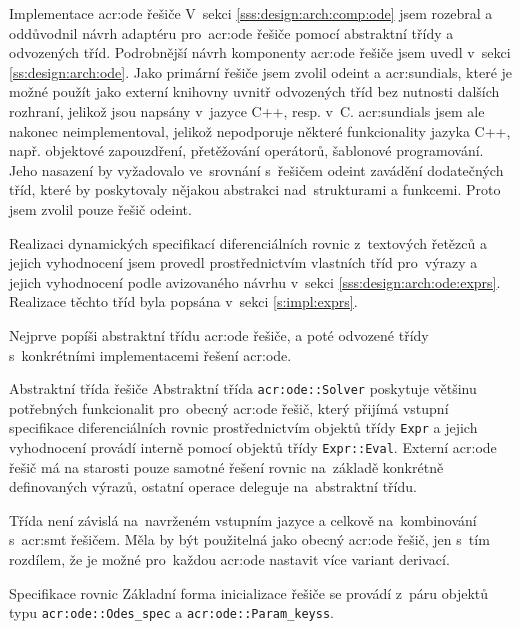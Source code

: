 \documentclass[thesis=M,czech]{FITthesis}[2012/06/26]
\newcommand{\acrlabel}[1]{acr:#1}
\newcommand{\acr}[1]{\acrshort{\acrlabel{#1}}}
\newcommand{\id}[1]{\texttt{#1}}
\newcommand{\rf}[1]{\ref{#1}}
\begin{document}
\begin{section}{Implementace \acr{ode} řešiče}\label{s:impl:ode}
V~sekci \rf{sss:design:arch:comp:ode} jsem rozebral
a oddůvodnil návrh adaptéru pro~\acr{ode} řešiče
pomocí abstraktní třídy a odvozených tříd.
Podrobnější návrh komponenty \acr{ode} řešiče
jsem uvedl v~sekci \rf{ss:design:arch:ode}.
Jako primární řešiče jsem zvolil odeint a \acr{sundials},
které je možné použít jako externí knihovny
uvnitř odvozených tříd bez nutnosti dalších rozhraní,
jelikož jsou napsány v~jazyce C++, resp. v~C.
\acr{sundials} jsem ale nakonec neimplementoval,
jelikož nepodporuje některé funkcionality jazyka C++,
např. objektové zapouzdření,
přetěžování operátorů, šablonové programování.
Jeho nasazení by vyžadovalo ve~srovnání s~řešičem odeint
zavádění dodatečných tříd,
které by poskytovaly nějakou abstrakci nad~strukturami a funkcemi.
Proto jsem zvolil pouze řešič odeint.

Realizaci dynamických specifikací diferenciálních rovnic
z~textových řetězců a jejich vyhodnocení
jsem provedl prostřednictvím
vlastních tříd pro~výrazy a jejich vyhodnocení
podle avizovaného návrhu v~sekci \rf{sss:design:arch:ode:exprs}.
Realizace těchto tříd byla popsána v~sekci \rf{s:impl:exprs}.

Nejprve popíši abstraktní třídu \acr{ode} řešiče,
a poté odvozené třídy s~konkrétními implementacemi řešení \acr{ode}.


\begin{subsection}{Abstraktní třída řešiče}
\label{ss:impl:ode:solver}
Abstraktní třída \id{\acr{ode}::\-Solver}
poskytuje většinu potřebných funkcionalit
pro~obecný \acr{ode} řešič,
který přijímá vstupní specifikace diferenciálních
rovnic prostřednictvím objektů třídy \id{Expr}
a jejich vyhodnocení provádí interně
pomocí objektů třídy \id{Expr::\-Eval}.
Externí \acr{ode} řešič má na starosti
pouze samotné řešení rovnic na~základě
konkrétně definovaných výrazů,
ostatní operace deleguje na~abstraktní třídu.

Třída není závislá na~navrženém vstupním jazyce
a celkově na~kombinování s~\acr{smt} řešičem.
Měla by být použitelná jako obecný \acr{ode} řešič,
jen s~tím rozdílem, že je možné pro~každou \acr{ode}
nastavit více variant derivací.


\begin{subsubsection}{Specifikace rovnic}\label{sss:impl:ode:solver:spec}
Základní forma inicializace řešiče se provádí
z~páru objektů typu \id{\acr{ode}::\-Odes\_\-spec}
a \id{\acr{ode}::\-Param\_\-keyss}.


\end{subsubsection}
\end{subsection}
\end{section}
\end{document}
